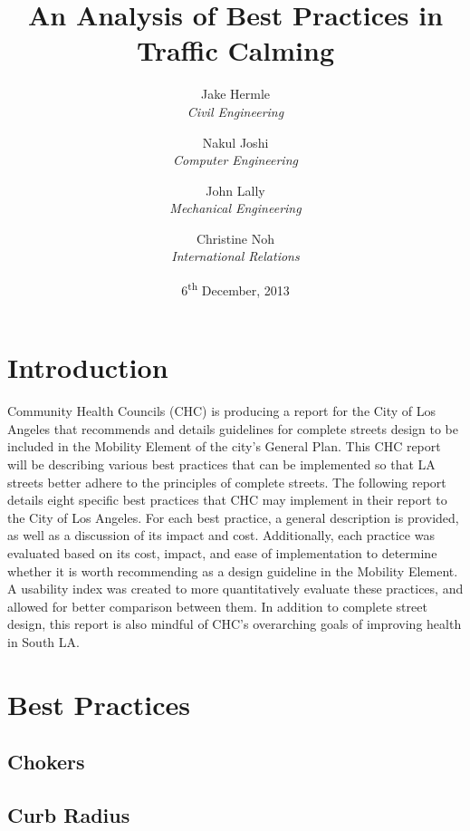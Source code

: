 \documentclass[titlepage,oneside]{article}
\title{An Analysis of Best Practices in Traffic Calming}
\author{
	Jake Hermle\\ \emph{Civil Engineering} \and
	Nakul Joshi\\ \emph{Computer Engineering} \and
	John Lally\\ \emph{Mechanical Engineering}\and
	Christine Noh\\ \emph{International Relations}
}
\date{6\textsuperscript{th} December, 2013}
\begin{document}
\listoftodos

\newpage
{}

\maketitle

\begin{abstract}
\end{abstract}


\tableofcontents
\newpage
\listoffigures
\newpage
\listoftables
\newpage



\section{Introduction}

Community Health Councils (CHC) is producing a report for the City of Los Angeles that recommends and details guidelines for complete streets design to be included in the Mobility Element of the city’s General Plan. This CHC report will be describing various best practices that can be implemented so that LA streets better adhere to the principles of complete streets. The following report details eight specific best practices that CHC may implement in their report to the City of Los Angeles. For each best practice, a general description is provided, as well as a discussion of its impact and cost. Additionally, each practice was evaluated based on its cost, impact, and ease of implementation to determine whether it is worth recommending as a design guideline in the Mobility Element. A usability index was created to more quantitatively evaluate these practices, and allowed for better comparison between them. In addition to complete street design, this report is also mindful of CHC’s overarching goals of improving health in South LA.

\newpage

\section{Best Practices}

	\subsection{Chokers}
	
	
	\subsection{Curb Radius}
	
	
\end{document}
